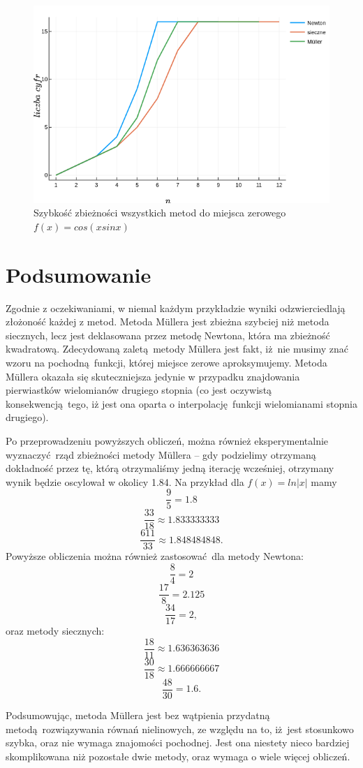 \documentclass[12pt]{article}
\begin{document}
\begin{figure}[H]
    \centering
    \includegraphics[scale=0.7]{plot6.png}
\caption{Szybkość zbieżności wszystkich metod do miejsca 
            zerowego $f(x) = cos(xsinx)$}
\label{figure:plot6}
\end{figure}

\section{Podsumowanie}

Zgodnie z oczekiwaniami, w niemal każdym przykładzie wyniki odzwierciedlają
złożoność każdej z metod. Metoda Müllera jest zbieżna szybciej niż metoda
siecznych, lecz jest deklasowana przez metodę Newtona, która ma zbieżność
kwadratową. Zdecydowaną zaletą metody Müllera jest fakt, iż nie musimy znać
wzoru na pochodną funkcji, której miejsce zerowe aproksymujemy. Metoda Müllera
okazała się skuteczniejsza jedynie w przypadku znajdowania pierwiastków
wielomianów drugiego stopnia (co jest oczywistą konsekwencją tego, iż jest ona
oparta o interpolację funkcji wielomianami stopnia drugiego).

Po przeprowadzeniu powyższych obliczeń, można również eksperymentalnie
wyznaczyć rząd zbieżności metody Müllera -- gdy podzielimy otrzymaną dokładność
przez tę, którą otrzymaliśmy jedną iterację wcześniej, otrzymany wynik będzie
oscylował w okolicy 1.84. 
Na przykład dla $f(x) = ln|x|$ mamy
\[\frac{9}{5} = 1.8\]
\[\frac{33}{18} \approx 1.833333333\]
\[\frac{611}{33} \approx 1.848484848.\]
Powyższe obliczenia można również zastosować dla metody Newtona:
\[\frac{8}{4} = 2\]
\[\frac{17}{8} = 2.125\]
\[\frac{34}{17} = 2,\]
oraz metody siecznych:
\[\frac{18}{11} \approx 1.636363636\]
\[\frac{30}{18} \approx 1.666666667\]
\[\frac{48}{30} = 1.6.\]
\newline

Podsumowując, metoda Müllera jest bez wątpienia przydatną metodą rozwiązywania
równań nielinowych, ze względu na to, iż jest stosunkowo szybka, oraz nie wymaga
znajomości pochodnej. Jest ona niestety nieco bardziej skomplikowana niż 
pozostałe dwie metody, oraz wymaga o wiele więcej obliczeń.

{}

\end{document}
